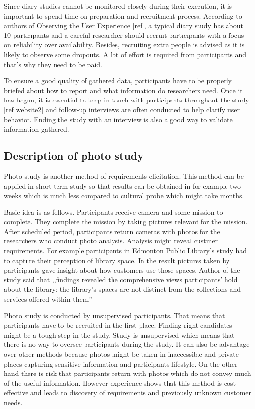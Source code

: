 \documentclass[12pt, a4paper]{article}
\begin{document}
Since diary studies cannot be monitored closely during their execution, it is important to spend time on preparation and recruitment process. According to authors of Observing the User Experience [ref], a typical diary study has about 10 participants and a careful researcher should recruit participants with a focus on reliability over availability. Besides, recruiting extra people is advised as it is likely to observe some dropouts. A lot of effort is required from participants and that’s why they need to be paid.

To ensure a good quality of gathered data, participants have to be properly briefed about how to report and what information do researchers need. Once it has begun, it is essential to keep in touch with participants throughout the study [ref website2] and follow-up interviews are often conducted to help clarify user behavior. Ending the study with an interview is also a good way to validate information gathered. 


\subsection{Description of photo study}
Photo study is another method of requirements elicitation. This method can be applied in short-term study so that results can be obtained in for example two weeks which is much less compared to cultural probe which might take months.

Basic idea is as follows. Participants receive camera and some mission to complete. They complete the mission by taking pictures relevant for the mission. After scheduled period, participants return cameras with photos for the researchers who conduct photo analysis. Analysis might reveal custmer requirements. For example participants in Edmonton Public Library's study\cite{photostudyExample} had to capture their perception of library space. In the result pictures taken by participants gave insight about how customers use those spaces. Author of the study said that ,,findings revealed the comprehensive views participants’ hold about the library; the 
library’s spaces are not distinct from the collections and services offered within them.'' 

Photo study is conducted by unsupervised participants. That means that participants have to be recruited in the first place. Finding right candidates might be a tough step in the study. Study is unsupervised which means that there is no way to oversee participants during the study. It can also be advantage over other methods because photos might be taken in inaccessible and private places capturing sensitive information and participants lifestyle. On the other hand there is risk that participants return with photos which do not convey much of the useful information. However experience shows that this method is cost effective and leads to discovery of requirements and previously unknown customer needs.
\end{document}
